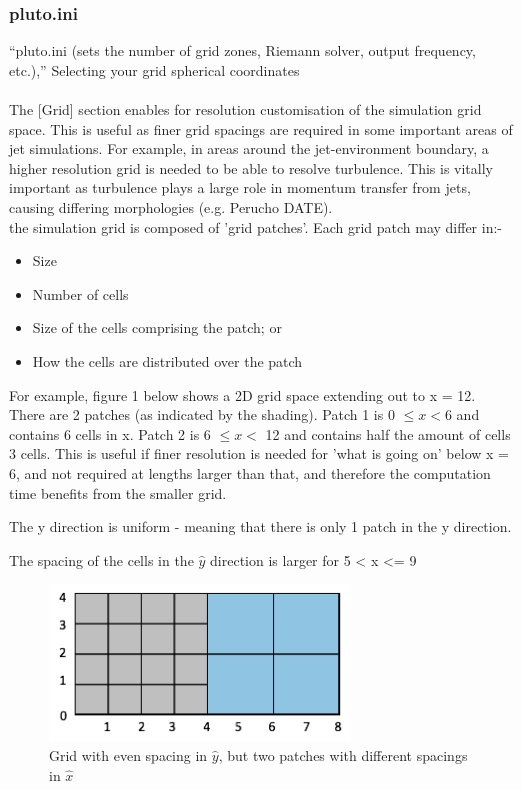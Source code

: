 \documentclass[12pt]{article}
\begin{document}
\subsubsection{pluto.ini}
“pluto.ini (sets the number of grid zones, Riemann solver, output frequency, etc.),”
Selecting your grid
spherical coordinates\\
\\
The [Grid] section enables for resolution customisation of the simulation grid space. This is useful as finer grid spacings are required in some important areas of jet simulations. For example, in areas around the jet-environment boundary, a higher resolution grid is needed to be able to resolve turbulence. This is vitally important as turbulence plays a large role in momentum transfer from jets, causing differing morphologies (e.g. Perucho DATE). \\
the simulation grid is composed of 'grid patches'. Each grid patch may differ in:- 
\begin{itemize}
\item Size
\item Number of cells
\item Size of the cells comprising the patch; or
\item How the cells are distributed over the patch
\end{itemize}
For example, figure 1 below shows a 2D grid space extending out to x = 12.  There are 2 patches (as indicated by the shading). Patch 1 is 0 $\leq x < 6$ and contains 6 cells in x. Patch 2 is 6 $\leq x <$ 12 and contains half the amount of cells 3 cells. This is useful if finer resolution is needed for 'what is going on' below x = 6, and not required at lengths larger than that, and therefore the computation time benefits from the smaller grid.


The y direction is uniform - meaning that there is only 1 patch in the y direction.


The spacing of the cells in the $\hat{y}$ direction is larger for 5 < x <= 9
\begin{figure}[h]
	\includegraphics[width=8cm]{gridspaces}
	\centering
	\caption{Grid with even spacing in $\hat{y}$, but two patches with different spacings in $\hat{x}$}
\end{figure}
\end{document}
